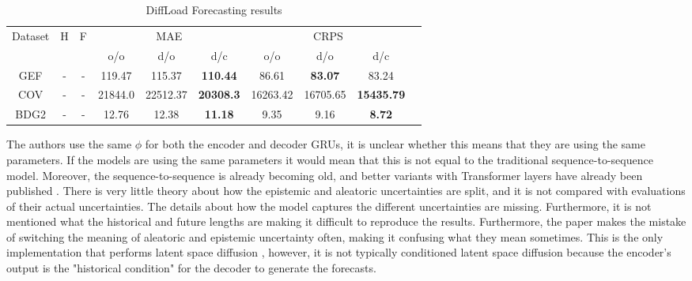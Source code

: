 \begin{table}[ht]
    \centering
    \begin{tabular}{cccccccccc}
        \toprule
        \multirow{2}{*}{Dataset} & \multirow{2}{*}{H} & \multirow{2}{*}{F} & \multicolumn{3}{c}{MAE} & \multicolumn{3}{c}{CRPS} \\
        \cmidrule(lr){4-6} \cmidrule(lr){7-9}
         & & & o/o & d/o & d/c & o/o & d/o & d/c \\
        \midrule
        GEF & - & - & 119.47 & 115.37 & \textbf{110.44} & 86.61 & \textbf{83.07} & 83.24 \\
        \midrule
        COV & - & - & 21844.0 & 22512.37 & \textbf{20308.3} & 16263.42 & 16705.65 & \textbf{15435.79} \\
        \midrule
        BDG2 & - & - & 12.76 & 12.38 & \textbf{11.18} & 9.35 & 9.16 & \textbf{8.72} \\
        \bottomrule
    \end{tabular}
    \caption{DiffLoad Forecasting results \cite{wang_diffload_2023}}
    \label{tab:diffload-results}
\end{table}

The authors use the same $\phi$ for both the encoder and decoder GRUs, it is unclear whether this means that they are using the same parameters. If the models are using the same parameters it would mean that this is not equal to the traditional sequence-to-sequence model. Moreover, the sequence-to-sequence is already becoming old, and better variants with Transformer layers have already been published \cite{nie_time_2023}. There is very little theory about how the epistemic and aleatoric uncertainties are split, and it is not compared with evaluations of their actual uncertainties. The details about how the model captures the different uncertainties are missing. Furthermore, it is not mentioned what the historical and future lengths are making it difficult to reproduce the results. Furthermore, the paper makes the mistake of switching the meaning of aleatoric and epistemic uncertainty often, making it confusing what they mean sometimes. This is the only implementation that performs latent space diffusion \cite{rombach_high-resolution_2022}, however, it is not typically conditioned latent space diffusion because the encoder's output is the "historical condition" for the decoder to generate the forecasts.